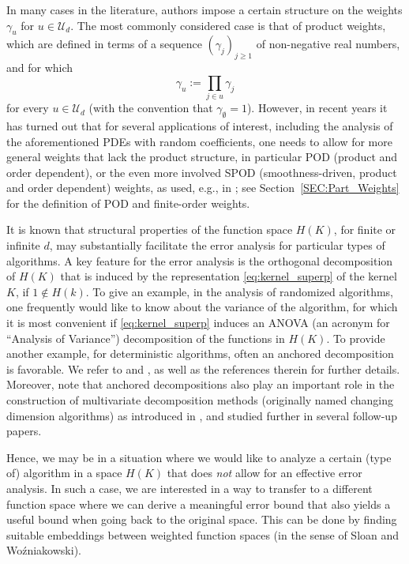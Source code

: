 \documentclass{article}
\newcommand{\U}  {\mathcal{U}}
\theoremstyle{plain}
\theoremstyle{definition}
\begin{document}
In many cases in the literature, authors impose a certain 
structure on the weights $\gamma_u$ for $u\in \U_d$. The 
most commonly considered case is that of product weights, which are 
defined in terms of a sequence $(\gamma_j)_{j\ge 1}$ of non-negative 
real numbers, and for which 
\[
\gamma_u := \prod_{j\in u} \gamma_j
\]
for every $u\in \U_d$ (with the convention that 
$\gamma_\emptyset =1$).
However, in recent years it has turned out that for several 
applications of interest, including the analysis of the 
aforementioned PDEs with random coefficients, one needs to allow for
more general weights that lack the product structure, in particular 
POD (product and order dependent), or the even more involved SPOD 
(smoothness-driven, product and order dependent) weights, 
as used, e.g., in \citet{HHKKS24}; see 
Section~\ref{SEC:Part_Weights} 
for the definition of POD and finite-order weights.

It is known that structural
properties of the function space $H(K)$,
for finite or infinite $d$, may substantially facilitate the error 
analysis for particular types of algorithms. 
A key feature for the error analysis is the orthogonal
decomposition of $H(K)$ that is induced by the representation
\eqref{eq:kernel_superp} of the kernel $K$, if 
$1 \not\in H(k)$.
To give an example, in the analysis of 
randomized algorithms, one frequently would like to know about the 
variance of the algorithm, for which it is 
most convenient if \eqref{eq:kernel_superp} induces
an ANOVA (an acronym for ``Analysis of Variance'')
decomposition of the functions in $H(K)$. 
To provide another example, for deterministic algorithms, often an 
anchored decomposition is favorable. We refer to \citet{BG14} and 
\citet{DG12}, as well as the references therein for 
further details. Moreover, note that anchored decompositions
also play an important role in the construction of 
multivariate decomposition methods (originally named changing 
dimension algorithms) as introduced in \citet{KSWW10a}, and studied 
further in several follow-up papers. 

Hence, we may be in a situation where we would like to analyze a 
certain (type of) algorithm in a space $H(K)$ 
that does \emph{not} allow for an effective error analysis. 
In such a case, we are interested in a way to transfer to a 
different function space where we can derive a meaningful error 
bound that also yields a useful
bound when going back to the original space. This 
can be done by finding suitable embeddings between weighted 
function spaces (in the sense of Sloan and
Wo\'zniakowski). 
\end{document}
